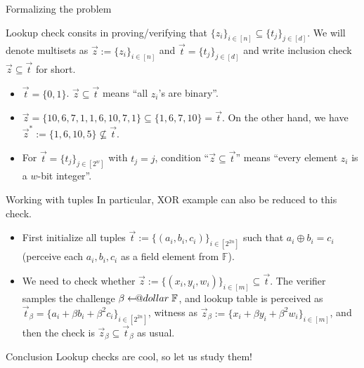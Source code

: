 \documentclass{zkdl-presentation-template}
\makeatletter
\newcommand\leftarrowS{\leftarrow\joinrel\smalldollar}
\newcommand{\smalldollar}{\mathrel{\mathpalette\small@dollar\relax}}
\newcommand{\small@dollar}[2]{%
  \vcenter{\hbox{%
    $#1\textnormal{\fontsize{0.7\dimexpr\f@size pt}{0}\selectfont\$}$%
  }}%
}
\makeatother
\begin{document}
    \begin{frame}{Formalizing the problem}
        \begin{definition}
            Lookup check consits in proving/verifying that $\{z_i\}_{i \in [n]}
            \subseteq \{t_j\}_{j \in [d]}$. We will denote multisets as $\vec{z}
            := \{z_i\}_{i \in [n]}$ and $\vec{t} = \{t_j\}_{j \in [d]}$ and
            write inclusion check $\vec{z} \subseteq \vec{t}$ for short.
        \end{definition}

        \begin{example}
            \begin{itemize}
                \item $\vec{t}=\{0,1\}$. $\vec{z} \subseteq \vec{t}$ means ``all $z_i$'s are binary''.
                \item $\vec{z}=\{10,6,7,1,1,6,10,7,1\} \subseteq \{1,6,7,10\} = \vec{t}$. On the other hand, we 
                have $\vec{z}^* := \{1,6,10,5\} \not\subseteq \vec{t}$.
                \item For $\vec{t} = \{t_j\}_{j \in [2^w]}$ with $t_j=j$,
                condition ``$\vec{z} \subseteq \vec{t}$'' means ``every element
                $z_i$ is a $w$-bit integer''.
            \end{itemize}
        \end{example}
    \end{frame}

    \begin{frame}{Working with tuples}
        In particular, XOR example can also be reduced to this check. 
        \begin{itemize}
            \item First initialize all tuples $\vec{t} := \{(a_i,b_i,c_i)\}_{i
            \in [2^{2n}]}$ such that $a_i \oplus b_i = c_i$ (perceive each
            $a_i,b_i,c_i$ as a field element from $\mathbb{F}$).
            \item We need to check whether $\vec{z} := \{(x_i,y_i,w_i)\}_{i \in
            [m]} \subseteq \vec{t}$. The verifier samples the challenge $\beta
            \leftarrowS \mathbb{F}$, and lookup table is perceived as
            $\vec{t}_{\beta} = \{a_i+\beta b_i+\beta^2 c_i\}_{i \in [2^{2n}]}$,
            witness as $\vec{z}_{\beta} := \{x_i+\beta y_i + \beta^2 w_i\}_{i
            \in [m]}$, and then the check is $\vec{z}_{\beta} \subseteq
            \vec{t}_{\beta}$ as usual.
        \end{itemize}

        \begin{block}{Conclusion}
            Lookup checks are cool, so let us study them!
        \end{block}
    \end{frame}
\end{document}
